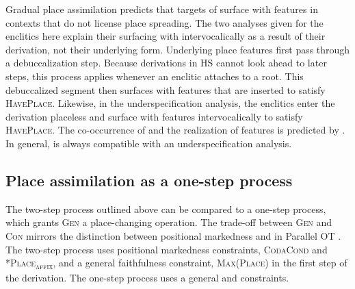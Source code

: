 \documentclass[output=paper,newtxmath,modfonts,nonflat,hidelinks]{langsci/langscibook}
\begin{document}
Gradual place assimilation predicts that targets of  surface with  features in contexts that do not license place spreading. The two analyses given for the  enclitics here explain their surfacing with  intervocalically as a result of their derivation, not their underlying form. Underlying place features first pass through a debuccalization step. Because derivations in HS cannot look ahead to later steps, this process applies whenever an enclitic attaches to a root. This debuccalized segment then surfaces with  features that are inserted to satisfy \textsc{HavePlace}. Likewise, in the underspecification analysis, the enclitics enter the derivation placeless and surface with  features intervocalically to satisfy \textsc{HavePlace}. The co-occurrence of  and the realization of  features is predicted by . In general,  is always compatible with an underspecification analysis.

\subsection{Place assimilation as a one-step process}
\largerpage[-1]
The two-step process outlined above can be compared to a one-step process, which grants \textsc{Gen} a place-changing operation. The trade-off between \textsc{Gen} and \textsc{Con} mirrors the distinction between positional markedness and  in Parallel OT \citep{zoll2004}. The two-step process uses positional markedness constraints, \textsc{CodaCond} and \textsc{*Place\textsubscript{affix}}, and a general faithfulness constraint, \textsc{Max(Place)} in the first step of the derivation. The one-step process uses a general  and  constraints.
\end{document}
